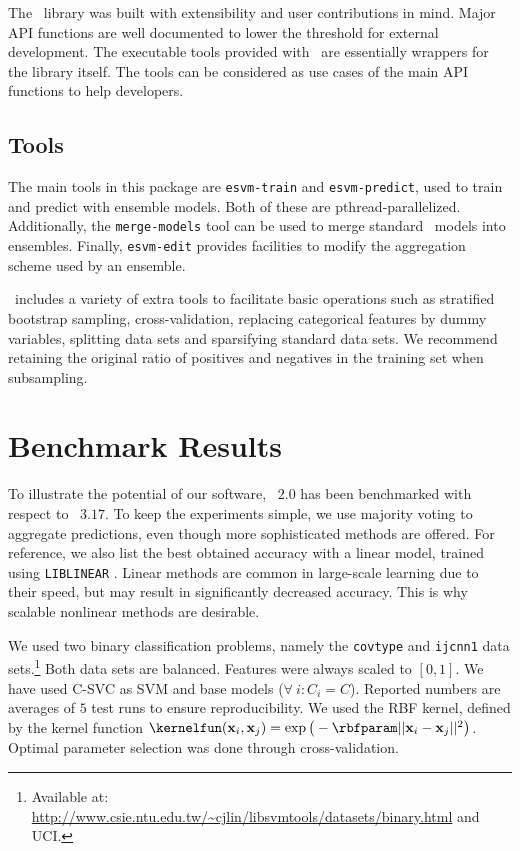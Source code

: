 {\noindent}The \esvm\ library was built with extensibility and user
contributions in mind.
Major API functions are well documented to lower the threshold
for external development. The executable tools provided with \esvm\ are
essentially wrappers for the library itself. The tools can be considered as use
cases of the main API functions to help developers.

\subsection{Tools}
The main tools in this package are {\tt esvm-train} and {\tt esvm-predict}, used
to train and predict with ensemble models. Both of these are pthread-parallelized. 
Additionally, the {\tt merge-models} tool can be used to merge standard \libsvm\ models into ensembles. 
Finally, {\tt esvm-edit} provides facilities to modify the aggregation scheme used by an ensemble.

\esvm\ includes a variety of extra tools to facilitate basic operations such as
stratified bootstrap sampling, cross-validation, replacing categorical features
by dummy variables, splitting data sets and sparsifying standard data sets. We recommend retaining the original ratio of positives and negatives in the training set when subsampling.

\section{Benchmark Results} \label{bench}
To illustrate the potential of our software, \esvm\ $2.0$ has been benchmarked with respect to \libsvm\
$3.17$. To keep the experiments simple, we use majority voting to aggregate predictions, even though more sophisticated methods are offered. For reference, we also list the best obtained accuracy with a linear model, trained using \texttt{LIBLINEAR} \citep{Fan:2008:LLL:1390681.1442794}. Linear methods are common in large-scale learning due to their speed, but may result in significantly decreased accuracy. This is why scalable nonlinear methods are desirable.

We used two binary classification problems, namely the {\tt covtype} and {\tt ijcnn1} data sets.\footnote{Available
at: \url{http://www.csie.ntu.edu.tw/~cjlin/libsvmtools/datasets/binary.html}
and UCI.} Both data sets are balanced. Features were always scaled to $[0,1]$. We have
used C-SVC as SVM and base models ($\forall\ i: C_i=C$). Reported numbers are averages of $5$ test runs to ensure reproducibility. We used the RBF kernel, defined by the kernel function
$\kernelfun(\mathbf{x}_i,\mathbf{x}_j)=\exp\big(-\rbfparam ||\mathbf{x}_i-\mathbf{x}_j||^2\big)$.
Optimal parameter selection was done through cross-validation.


